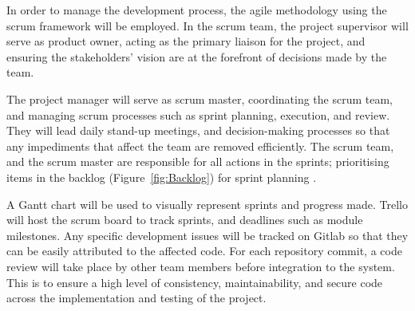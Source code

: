 
In order to manage the development process, the agile methodology using the scrum framework will be employed. In the scrum team, the project supervisor will serve as product owner, acting as the primary liaison for the project, and ensuring the stakeholders' vision are at the forefront of decisions made by the team.

The project manager will serve as scrum master, coordinating the scrum team, and managing scrum processes such as sprint planning, execution, and review. They will lead daily stand-up meetings, and decision-making processes so that any impediments that affect the team are removed efficiently. The scrum team, and the scrum master are responsible for all actions in the sprints; prioritising items in the backlog (Figure~\ref{fig:Backlog}) for sprint planning \cite{scrumroles}.

A Gantt chart will be used to visually represent sprints and progress made. Trello will host the scrum board to track sprints, and deadlines such as module milestones. Any specific development issues will be tracked on Gitlab so that they can be easily attributed to the affected code. For each repository commit, a code review will take place by other team members before integration to the system. This is to ensure a high level of consistency, maintainability, and secure code across the implementation and testing of the project. 